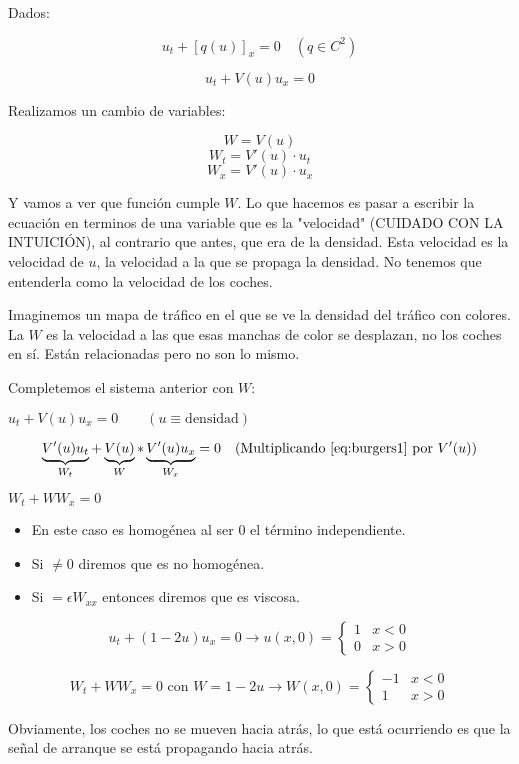 		Dados:

		$$ u_t + [q(u)]_x = 0 \quad (q \in C^2) $$

		$$u_t + V(u)u_x = 0 $$

		Realizamos un cambio de variables:

		$$W = V(u)$$
		$$W_t = V'(u) \cdot u_t$$
		$$W_x = V'(u) \cdot u_x$$

		Y vamos a ver que función cumple $W$. Lo que hacemos es pasar a escribir la ecuación en terminos de una variable que es la "velocidad" (CUIDADO CON LA INTUICIÓN), al contrario que antes, que era de la densidad. Esta velocidad es la velocidad de $u$, la velocidad a la que se propaga la densidad. No tenemos que entenderla como la velocidad de los coches.

		Imaginemos un mapa de tráfico en el que se ve la densidad del tráfico con colores. La $W$ es la velocidad a las que esas manchas de color se desplazan, no los coches en sí. Están relacionadas pero no son lo mismo.

		Completemos el sistema anterior con $W$:

		\(u_t + V(u) u_x = 0\quad\quad (u \equiv \text{densidad}) \label{eq:burgers1}\)

		$$\underbrace{V'(u) u_t}_{W_t} + \underbrace{V(u)}_{W} * \underbrace{V'(u) u_x}_{W_x} = 0 \quad \text{(Multiplicando \ref{eq:burgers1} por }V'(u)\text{)}$$

		\( W_t + WW_x = 0 \label{eq:Ecuación de Burgers} \)



		\begin{itemize}
			\item En este caso es homogénea al ser $0$ el término independiente.
			\item Si $\neq 0$ diremos que es no homogénea.
			\item Si $ = \epsilon W_{xx}$ entonces diremos que es viscosa.
		\end{itemize}

		\begin{example}
			\[u_t + (1-2u) u_x = 0
			\rightarrow u(x,0) =
			\begin{cases}
				1 & x < 0 \\
				0 & x > 0
			\end{cases}
			\]

			\[W_t + W W_x = 0 \text{ con } W = 1 - 2u
			\rightarrow W(x,0) =
			\begin{cases}
				-1 & x < 0 \\
				1 & x > 0
			\end{cases}
			\]

			Obviamente, los coches no se mueven hacia atrás, lo que está ocurriendo es que la señal de arranque se está propagando hacia atrás.

		\end{example}


